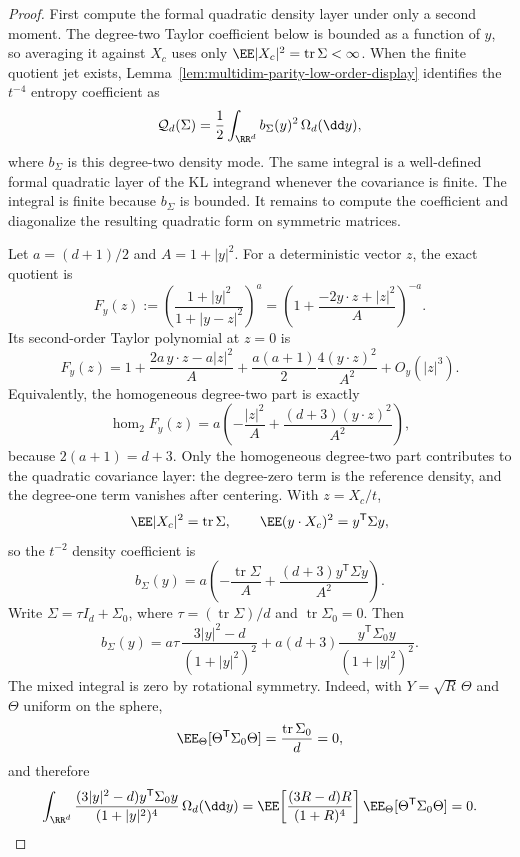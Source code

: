\begin{proof}
First compute the formal quadratic density layer under only a second moment.  The
degree-two Taylor coefficient below is bounded as a function of \(y\), so
averaging it against \(X_c\) uses only
\(\EE|X_c|^2=\operatorname{tr}\Sigma<\infty\).  When the finite quotient jet
exists, Lemma~\ref{lem:multidim-parity-low-order-display} identifies the
\(t^{-4}\) entropy coefficient as
\[
\mathcal Q_d(\Sigma)
=\frac12\int_{\RR^d} b_\Sigma(y)^2\,\Omega_d(\dd y),
\]
where \(b_\Sigma\) is this degree-two density mode.  The same integral is a
well-defined formal quadratic layer of the KL integrand whenever the
covariance is finite.  The integral is finite because \(b_\Sigma\) is bounded.
It remains to compute the coefficient and diagonalize the resulting quadratic
form on symmetric matrices.

Let \(a=(d+1)/2\) and \(A=1+|y|^2\).  For a deterministic vector \(z\), the
exact quotient is
\[
F_y(z):=
\left(\frac{1+|y|^2}{1+|y-z|^2}\right)^a
=
\left(1+\frac{-2y\cdot z+|z|^2}{A}\right)^{-a}.
\]
Its second-order Taylor polynomial at \(z=0\) is
\[
F_y(z)
=1+\frac{2a\,y\cdot z-a|z|^2}{A}
+\frac{a(a+1)}{2}\frac{4(y\cdot z)^2}{A^2}
+O_y(|z|^3).
\]
Equivalently, the homogeneous degree-two part is exactly
\begin{equation}\label{eq:multidim-leading-homogeneous-degree-two}
\operatorname{hom}_2F_y(z)
=
a\left(
-\frac{|z|^2}{A}
+\frac{(d+3)(y\cdot z)^2}{A^2}
\right),
\end{equation}
because \(2(a+1)=d+3\).
Only the homogeneous degree-two part contributes to the quadratic covariance
layer: the degree-zero term is the reference density, and the degree-one term
vanishes after centering.  With \(z=X_c/t\),
\[
\EE |X_c|^2=\operatorname{tr}\Sigma,\qquad
\EE (y\cdot X_c)^2=y^{\mathsf T}\Sigma y,
\]
so the \(t^{-2}\) density coefficient is
\begin{equation}\label{eq:multidim-leading-density-coefficient}
b_\Sigma(y)
=
a\left(
-\frac{\operatorname{tr}\Sigma}{A}
+\frac{(d+3)y^{\mathsf T}\Sigma y}{A^2}
\right).
\end{equation}
Write \(\Sigma=\tau I_d+\Sigma_0\), where
\(\tau=(\operatorname{tr}\Sigma)/d\) and
\(\operatorname{tr}\Sigma_0=0\).  Then
\begin{equation}\label{eq:multidim-leading-isotropic-traceless-split}
b_\Sigma(y)
=a\tau\,\frac{3|y|^2-d}{(1+|y|^2)^2}
+a(d+3)\frac{y^{\mathsf T}\Sigma_0y}{(1+|y|^2)^2}.
\end{equation}
The mixed integral is zero by rotational symmetry.  Indeed, with
\(Y=\sqrt R\,\Theta\) and \(\Theta\) uniform on the sphere,
\[
\EE_\Theta[\Theta^{\mathsf T}\Sigma_0\Theta]
=\frac{\operatorname{tr}\Sigma_0}{d}=0,
\]
and therefore
\[
\int_{\RR^d}
\frac{(3|y|^2-d)y^{\mathsf T}\Sigma_0y}
{(1+|y|^2)^4}\,\Omega_d(\dd y)
=
\EE\!\left[
\frac{(3R-d)R}{(1+R)^4}
\right]\EE_\Theta[\Theta^{\mathsf T}\Sigma_0\Theta]
=0 .
\]


\end{proof}
